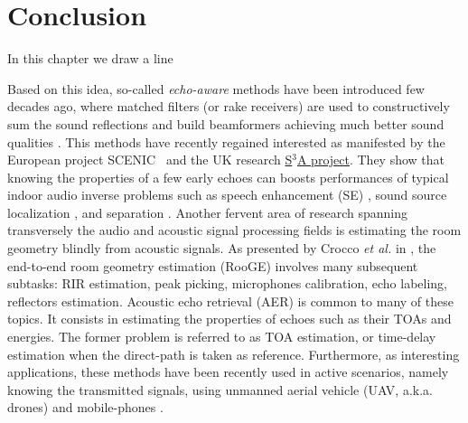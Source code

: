 



\section{Conclusion}\label{sec:application:conclusion}
In this chapter we draw a line

Based on this idea, so-called \textit{echo-aware} methods have been introduced few decades ago, where matched filters (or rake receivers) are used to constructively sum the sound reflections  and build beamformers achieving much better sound qualities .
This methods have recently regained interested as manifested by the European project SCENIC~ and the UK research \href{http://www.s3a-spatialaudio.org/}{S$^3$A project}.
They show that knowing the properties of a few early echoes can boosts performances of typical indoor audio inverse problems such as speech enhancement (SE) , sound source localization , and separation .
Another fervent area of research spanning transversely the audio and acoustic signal processing fields is estimating the room geometry blindly from acoustic signals.
As presented by Crocco \textit{et al.} in , the end-to-end room geometry estimation (RooGE) involves many subsequent subtasks:
RIR estimation, peak picking, microphones calibration, echo labeling, reflectors estimation. Acoustic echo retrieval (AER) is common to many of these topics. It consists in estimating the properties of echoes such as their TOAs and energies. The former problem is referred to as TOA estimation, or time-delay estimation when the direct-path is taken as reference. Furthermore, as interesting applications, these methods have been recently used in active scenarios, namely knowing the transmitted signals, using unmanned aerial vehicle (UAV, a.k.a. drones)  and mobile-phones .





